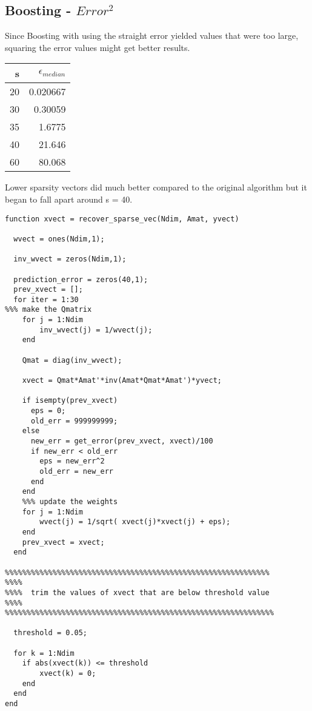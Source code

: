 \documentclass[11pt]{article}
\begin{document}
\subsection{Boosting - \(Error^2\)}
\label{sec:org507ff5f}

Since Boosting with using the straight error yielded values that were too large,
squaring the error values might get better results.

\begin{center}
\begin{tabular}{rr}
s & \(\epsilon_{median}\)\\
\hline
20 & 0.020667\\
30 & 0.30059\\
35 & 1.6775\\
40 & 21.646\\
60 & 80.068\\
\end{tabular}
\end{center}

Lower sparsity vectors did much better compared to the original algorithm but
it began to fall apart around s = 40.

\begin{verbatim}
function xvect = recover_sparse_vec(Ndim, Amat, yvect)

  wvect = ones(Ndim,1);

  inv_wvect = zeros(Ndim,1);

  prediction_error = zeros(40,1);
  prev_xvect = [];
  for iter = 1:30
%%% make the Qmatrix
    for j = 1:Ndim
        inv_wvect(j) = 1/wvect(j);
    end

    Qmat = diag(inv_wvect);

    xvect = Qmat*Amat'*inv(Amat*Qmat*Amat')*yvect;

    if isempty(prev_xvect)
      eps = 0;
      old_err = 999999999;
    else
      new_err = get_error(prev_xvect, xvect)/100
      if new_err < old_err
        eps = new_err^2
        old_err = new_err
      end
    end
    %%% update the weights
    for j = 1:Ndim
        wvect(j) = 1/sqrt( xvect(j)*xvect(j) + eps);
    end
    prev_xvect = xvect;
  end

%%%%%%%%%%%%%%%%%%%%%%%%%%%%%%%%%%%%%%%%%%%%%%%%%%%%%%%%%%%%%
%%%%
%%%%  trim the values of xvect that are below threshold value
%%%%
%%%%%%%%%%%%%%%%%%%%%%%%%%%%%%%%%%%%%%%%%%%%%%%%%%%%%%%%%%%%%%

  threshold = 0.05;

  for k = 1:Ndim
    if abs(xvect(k)) <= threshold
        xvect(k) = 0;
    end
  end
end
\end{verbatim}
\end{document}
